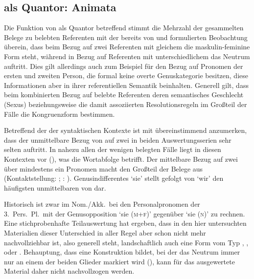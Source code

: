 \subsection{ als Quantor: Animata}

Die Funktion von  als Quantor betreffend stimmt die Mehrzahl der
gesammelten Belege zu belebten Referenten mit der bereits von
\citet[312]{grimm1890} und \citet[39--41]{behaghel1928} formulierten
Beobachtung überein, dass beim Bezug auf zwei Referenten mit gleichem
 die maskulin-feminine Form steht, während in Bezug auf Referenten
mit unterschiedlichem  das Neutrum auftritt. Dies gilt allerdings
auch zum Beispiel für den Bezug auf Pronomen der ersten und zweiten Person, die
formal keine overte Genuskategorie besitzen, diese
Informationen aber in ihrer referentiellen Semantik beinhalten. Generell gilt,
dass beim kombinierten Bezug auf belebte Referenten deren semantisches
Geschlecht (Sexus) beziehungsweise die damit assoziierten Resolutionsregeln im
Großteil der Fälle die Kongruenzform bestimmen.

Betreffend der  der syntaktischen Kontexte ist
mit \citet[624, Abbildung P~179]{ksw2} übereinstimmend anzumerken, dass der
unmittelbare Bezug von  auf zwei  in beiden
Auswertungsserien sehr selten auftritt. In nahezu allen der wenigen belegten
Fälle liegt in diesen Kontexten  vor
(), was die
Wortabfolge betrifft. Der mittelbare Bezug auf zwei  über
mindestens ein Pronomen macht den Großteil der Belege aus (Kontaktstellung:
; :
).
Genus\-indifferentes  `sie' stellt gefolgt von
 `wir' den häufigsten unmittelbaren  von 
dar.

Historisch ist zwar im Nom./Akk.\ bei den Personalpronomen der
3.~Pers.\ Pl.\ mit der Genus\-opposition  `sie (\textsc{m+f})'
gegenüber  `sie (\textsc{n})' zu rechnen. Eine stichprobenhafte
Teilauswertung hat ergeben, dass in den hier untersuchten Materialien dieser
Unterschied in aller Regel aber schon nicht mehr nachvollziehbar ist, also
generell  steht, landschaftlich auch eine Form vom Typ
,
,
 oder
\autocites[vgl.][213--214]{paul2007}[369, 390--397]{ksw2}[482--483]{wmu1}.
 Behauptung, dass  eine
Konstruktion bildet, bei der das Neutrum immer nur an einem der beiden Glieder
markiert wird (), kann für das ausgewertete Material daher
nicht nachvollzogen werden.

